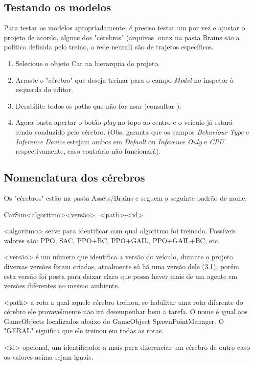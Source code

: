 \begin{apendicesenv}
\subsection*{Testando os modelos}
Para testar os modelos apropriadamente, é preciso testar um por vez e ajustar o projeto de acordo, alguns dos "cérebros"{} (arquivos .onnx na pasta Brains são a política definida pelo treino, a rede neural) são de trajetos específicos.

\begin{enumerate}
    \item Selecione o objeto Car na hierarquia do projeto.
    \item Arraste o "cérebro"{} que deseja treinar para o campo \textit{Model} no inspetor à esquerda do editor.
    \item Desabilite todos os paths que não for usar (consultar ).
    \item Agora basta apertar o botão \textit{play} no topo ao centro e o veículo já estará sendo conduzido pelo cérebro. (Obs. garanta que os campos \textit{Behaviour Type} e \textit{Inference Device} estejam ambos em \textit{Default}  ou  \textit{Inference Only} e \textit{CPU} respectivamente, caso contrário não funcionará).
\end{enumerate}

\subsection*{Nomenclatura dos cérebros}\label{nomenclatura}
Os "cérebros"{} estão na pasta Assets/Brains e seguem o seguinte padrão de nome:

CarSim<algoritmo><versão>\_<path>-<id>

<algoritmo> serve para identificar com qual algoritmo foi treinado. Possíveis valores são: PPO, SAC, PPO+BC, PPO+GAIL, PPO+GAIL+BC, etc. 

<versão> é um número que identifica a versão do veículo, durante o projeto diversas versões foram criadas, atualmente só há uma versão dele (3.1), porém esta versão foi posta para deixar claro que possa haver mais de um agente em versões diferentes no mesmo ambiente.

<path> a rota a qual aquele cérebro treinou, se habilitar uma rota diferente do cérebro ele provavelmente não irá desempenhar bem a tarefa. O nome é igual aos GameObjects localizados abaixo do GameObject SpawnPointManager. O "GERAL"{} significa que ele treinou em todas as rotas.

<id> opcional, um identificador a mais para diferenciar um cérebro de outro caso os valores acima sejam iguais.



\end{apendicesenv}
